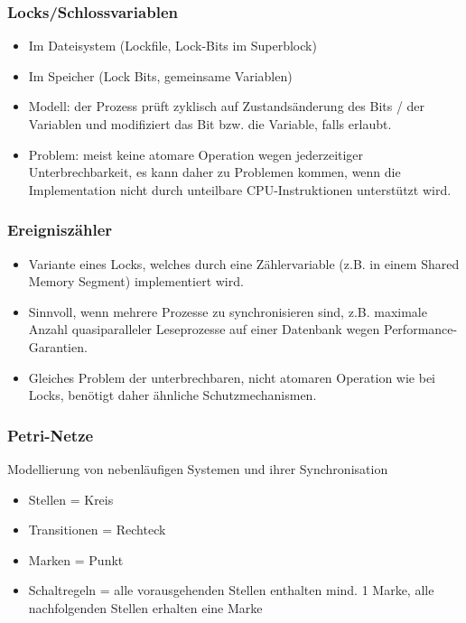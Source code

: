 \documentclass[a4paper, 10pt]{article}
\begin{document}
\subsubsection{Locks/Schlossvariablen}
\begin{itemize}
	\item Im Dateisystem (Lockfile, Lock-Bits im Superblock)
	\item Im Speicher (Lock Bits, gemeinsame Variablen)
	\item Modell: der Prozess prüft zyklisch auf Zustandsänderung des Bits / der Variablen und modifiziert das Bit bzw. die Variable, falls erlaubt.
	\item Problem: meist keine atomare Operation wegen jederzeitiger Unterbrechbarkeit, es kann daher zu Problemen kommen, wenn die Implementation nicht durch unteilbare CPU-Instruktionen unterstützt wird.
\end{itemize}

\subsubsection{Ereigniszähler}
\begin{itemize}
	\item Variante eines Locks, welches durch eine Zählervariable (z.B. in einem Shared Memory Segment) implementiert wird.
	\item Sinnvoll, wenn mehrere Prozesse zu synchronisieren sind, z.B. maximale Anzahl quasiparalleler Leseprozesse auf einer Datenbank wegen Performance-Garantien.
	\item Gleiches Problem der unterbrechbaren, nicht atomaren Operation wie bei Locks, benötigt daher ähnliche Schutzmechanismen.
\end{itemize}

\subsubsection{Petri-Netze}
Modellierung von nebenläufigen Systemen und ihrer Synchronisation
\begin{itemize}
	\item Stellen = Kreis
	\item Transitionen = Rechteck
	\item Marken = Punkt
	\item Schaltregeln = alle vorausgehenden Stellen enthalten mind. 1 Marke, alle nachfolgenden Stellen erhalten eine Marke
\end{itemize}
\end{document}
